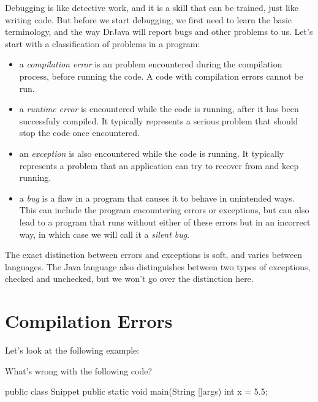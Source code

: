 Debugging is like detective work, and it is a skill that can be trained, just like writing code. But before we start debugging, we first need to learn the basic terminology, and the way DrJava will report bugs and other problems to us. Let's start with a classification of problems in a program:

\begin{definition}
\leavevmode\newline
\begin{itemize}
    \item a \emph{compilation error} is an problem encountered during the compilation process, before running the code. A code with compilation errors cannot be run.
    \item a \emph{runtime error} is encountered while the code is running, after it has been successfuly compiled. It typically represents a serious problem that should stop the code once encountered.
    \item an \emph{exception} is also encountered while the code is running. It typically represents a problem that an application can try to recover from and keep running.
    \item a \emph{bug} is a flaw in a program that causes it to behave in unintended ways. This can include the program encountering errors or exceptions, but can also lead to a program that runs without either of these errors but in an incorrect way, in which case we will call it a \emph{silent bug}.
\end{itemize}
\end{definition}

The exact distinction between errors and exceptions is soft, and varies between languages. The Java language also distinguishes between two types of exceptions, checked and unchecked, but we won't go over the distinction here.

\section{Compilation Errors}

Let's look at the following example:

\begin{example}
What's wrong with the following code?

\begin{code}
public class Snippet{
    public static void main(String []args){
        int x = 5.5;
    }
}
\end{code}
\end{example}

